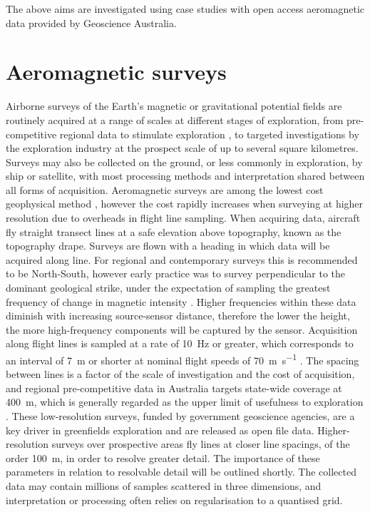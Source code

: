 The above aims are investigated using case studies with open access aeromagnetic data provided by Geoscience Australia.

\section{Aeromagnetic surveys}
\label{sec:introgeo}
Airborne surveys of the Earth's magnetic or gravitational potential fields are routinely acquired at a range of scales at different stages of exploration, from pre-competitive regional data to stimulate exploration \parencite{howardAirborneGeophysicalCoverage2004}, to targeted investigations by the exploration industry at the prospect scale of up to several square kilometres.
Surveys may also be collected on the ground, or less commonly in exploration, by ship or satellite, with most processing methods and interpretation shared between all forms of acquisition.
Aeromagnetic surveys are among the lowest cost geophysical method \parencite{dentithGeophysicsMineralExploration2014}, however the cost rapidly increases when surveying at higher resolution due to overheads in flight line sampling.
When acquiring data, aircraft fly straight transect lines at a safe elevation above topography, known as the topography drape.
Surveys are flown with a heading in which data will be acquired along line.
For regional and contemporary surveys this is recommended to be North-South, however early practice was to survey perpendicular to the dominant geological strike, under the expectation of sampling the greatest frequency of change in magnetic intensity \parencite{islesGeologicalInterpretationAeromagnetic2018}.
Higher frequencies within these data diminish with increasing source-sensor distance, therefore the lower the height, the more high-frequency components will be captured by the sensor.
Acquisition along flight lines is sampled at a rate of \qty{10}{\hertz} or greater, which corresponds to an interval of \qty{7}{\m} or shorter at nominal flight speeds of \qty{70}{\m\per\s} \parencite{goodwinAirborneMagneticRadiometric2023}.
The spacing between lines is a factor of the scale of investigation and the cost of acquisition, and regional pre-competitive data in Australia targets state-wide coverage at \qty{400}{\m}, which is generally regarded as the upper limit of usefulness to exploration \parencite{howardAirborneGeophysicalCoverage2004}.
These low-resolution surveys, funded by government geoscience agencies, are a key driver in greenfields exploration and are released as open file data.
Higher-resolution surveys over prospective areas fly lines at closer line spacings, of the order \qty{100}{\m}, in order to resolve greater detail.
The importance of these parameters in relation to resolvable detail will be outlined shortly.
The collected data may contain millions of samples scattered in three dimensions, and interpretation or processing often relies on regularisation to a quantised grid.

